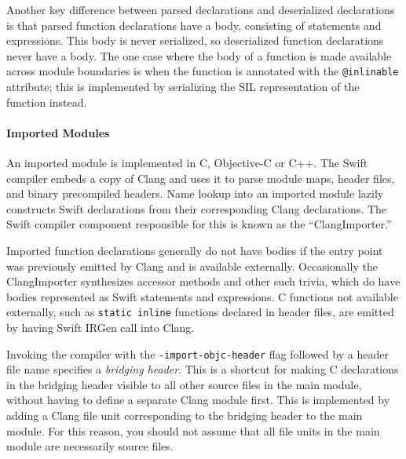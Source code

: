 \documentclass[a4paper,headsepline,bibliography=totoc,toc=flat,fleqn,twoside=semi]{scrbook}
\theoremstyle{definition}
\theoremstyle{definition}
\theoremstyle{definition}
\begin{document}
Another key difference between parsed declarations and deserialized declarations is that parsed function declarations have a body, consisting of statements and expressions. This body is never serialized, so deserialized function declarations never have a body. The one case where the body of a function is made available across module boundaries is when the function is annotated with the \texttt{@inlinable} attribute; this is implemented by serializing the SIL representation of the function instead.

\paragraph{Imported Modules} An imported module is implemented in C, Objective-C or C++. The Swift compiler embeds a copy of Clang and uses it to parse module maps, header files, and binary precompiled headers. Name lookup into an imported module lazily constructs Swift declarations from their corresponding Clang declarations. The Swift compiler component responsible for this is known as the ``ClangImporter.''

Imported function declarations generally do not have bodies if the entry point was previously emitted by Clang and is available externally. Occasionally the ClangImporter synthesizes accessor methods and other such trivia, which do have bodies represented as Swift statements and expressions. C functions not available externally, such as \texttt{static inline} functions declared in header files, are emitted by having Swift IRGen call into Clang.

Invoking the compiler with the \texttt{-import-objc-header} flag followed by a header file name specifies a \emph{bridging header}. This is a shortcut for making C declarations in the bridging header visible to all other source files in the main module, without having to define a separate Clang module first. This is implemented by adding a Clang file unit corresponding to the bridging header to the main module. For this reason, you should not assume that all file units in the main module are necessarily source files.

\end{document}
